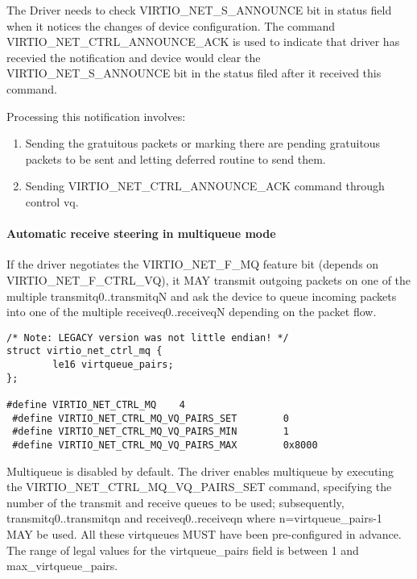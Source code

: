 The Driver needs to check VIRTIO_NET_S_ANNOUNCE bit in status
field when it notices the changes of device configuration. The
command VIRTIO_NET_CTRL_ANNOUNCE_ACK is used to indicate that
driver has recevied the notification and device would clear the
VIRTIO_NET_S_ANNOUNCE bit in the status filed after it received
this command.

Processing this notification involves:

\begin{enumerate}
\item Sending the gratuitous packets or marking there are pending
  gratuitous packets to be sent and letting deferred routine to
  send them.

\item Sending VIRTIO_NET_CTRL_ANNOUNCE_ACK command through control
  vq.
\end{enumerate}

\paragraph{Automatic receive steering in multiqueue mode}\label{sec:Device Types / Network Device / Device Operation / Control Virtqueue / Automatic receive steering in multiqueue mode}

If the driver negotiates the VIRTIO_NET_F_MQ feature bit (depends
on VIRTIO_NET_F_CTRL_VQ), it MAY transmit outgoing packets on one
of the multiple transmitq0..transmitqN and ask the device to
queue incoming packets into one of the multiple receiveq0..receiveqN
depending on the packet flow.

\begin{lstlisting}
/* Note: LEGACY version was not little endian! */
struct virtio_net_ctrl_mq {
        le16 virtqueue_pairs;
};

#define VIRTIO_NET_CTRL_MQ    4
 #define VIRTIO_NET_CTRL_MQ_VQ_PAIRS_SET        0
 #define VIRTIO_NET_CTRL_MQ_VQ_PAIRS_MIN        1
 #define VIRTIO_NET_CTRL_MQ_VQ_PAIRS_MAX        0x8000
\end{lstlisting}

Multiqueue is disabled by default. The driver enables multiqueue by
executing the VIRTIO_NET_CTRL_MQ_VQ_PAIRS_SET command, specifying
the number of the transmit and receive queues to be used; subsequently,
transmitq0..transmitqn and receiveq0..receiveqn where
n=virtqueue_pairs-1 MAY be used. All these virtqueues MUST have
been pre-configured in advance. The range of legal values for the
virtqueue_pairs field is between 1 and max_virtqueue_pairs.

